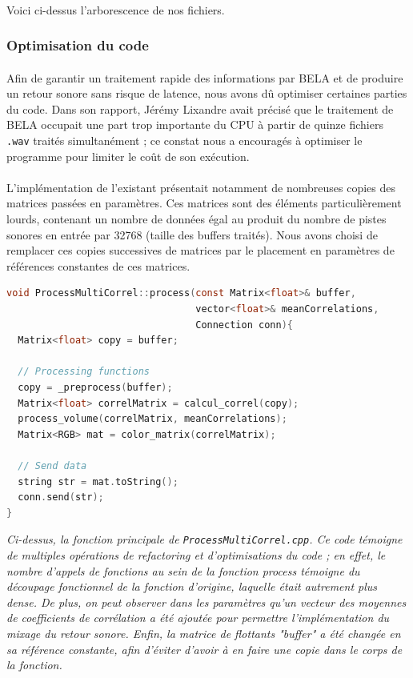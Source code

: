 \paragraph{}
Voici ci-dessus l'arborescence de nos fichiers.


\subsubsection{Optimisation du code}
\paragraph{}
Afin de garantir un traitement rapide des informations par BELA et de
produire un retour sonore sans risque de latence, nous avons dû
optimiser certaines parties du code. Dans son rapport, Jérémy Lixandre
avait précisé que le traitement de BELA occupait une part trop
importante du CPU à partir de quinze fichiers \verb!.wav! traités
simultanément ; ce constat nous a encouragés à optimiser le programme
pour limiter le coût de son exécution.
\paragraph{}
L'implémentation de l'existant présentait notamment de nombreuses
copies des matrices passées en paramètres. Ces matrices sont des
éléments particulièrement lourds, contenant un nombre de données égal
au produit du nombre de pistes sonores en entrée par 32768 (taille des
buffers traités). Nous avons choisi de remplacer ces copies
successives de matrices par le placement en paramètres de références
constantes de ces matrices.

\begin{lstlisting}[language=C, frame=single, breaklines=true]
void ProcessMultiCorrel::process(const Matrix<float>& buffer,
                                 vector<float>& meanCorrelations,
                                 Connection conn){
  Matrix<float> copy = buffer;

  // Processing functions
  copy = _preprocess(buffer);
  Matrix<float> correlMatrix = calcul_correl(copy);
  process_volume(correlMatrix, meanCorrelations);
  Matrix<RGB> mat = color_matrix(correlMatrix);

  // Send data
  string str = mat.toString();
  conn.send(str);
}
\end{lstlisting}
\begin{center}
 \textit{Ci-dessus, la fonction principale de
  \verb!ProcessMultiCorrel.cpp!. Ce code témoigne de multiples
  opérations de refactoring et d'optimisations du code ; en effet,
  le nombre d'appels de fonctions au sein de la fonction process témoigne du
  découpage fonctionnel de la fonction d'origine, laquelle était autrement
  plus dense. De plus, on peut observer dans les paramètres qu'un
  vecteur des moyennes de coefficients de corrélation a été ajoutée
  pour permettre l'implémentation du mixage du retour sonore. Enfin,
  la matrice de flottants "buffer" a été changée en sa référence
  constante, afin d'éviter d'avoir à en faire une copie dans le
 corps de la fonction.}
\end{center}

